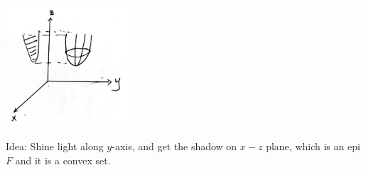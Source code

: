 \begin{marginfigure}
	\centering
	\includegraphics[width=1.8in,height=1.8in]{figures/ch08/figure1104_2.png}
\end{marginfigure}

Idea: Shine light along $y$-axis, and get the shadow on $x-z$ plane, which is an epi $F$ and it is a convex set. 

